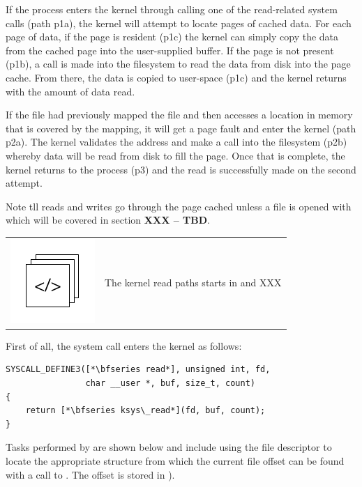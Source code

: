 \noindent
If the process enters the kernel through calling one of the read-related system calls (path p1a), the kernel will attempt to locate pages of cached data. For each page of data, if the page is resident (p1c) the kernel can simply copy the data from the cached page into the user-supplied buffer. If the page is not present (p1b), a call is made into the filesystem to read the data from disk into the page cache. From there, the data is copied to user-space (p1c) and the kernel returns with the amount of data read.

If the file had previously mapped the file and then accesses a location in memory that is covered by the mapping, it will get a page fault and enter the kernel (path p2a). The kernel validates the address and make a call into the filesystem (p2b) whereby data will be read from disk to fill the page. Once that is complete, the kernel returns to the process (p3) and the read is successfully made on the second attempt.

Note tll reads and writes go through the page cached unless a file is opened with  which will be covered in section \textbf{XXX -- TBD}.

\begin{table}[h]
\begin{tabular}{ll}
\parbox[l]{0.6in}{\includegraphics[scale=0.8]{figures/src-xref.pdf}} & \parbox[l]{4in}{\small{The kernel read paths starts in  and XXX}}
\end{tabular}
\end{table}

\noindent
First of all, the  system call enters the kernel as follows:

\begin{lstlisting}
SYSCALL_DEFINE3([*\bfseries read*], unsigned int, fd, 
                char __user *, buf, size_t, count)
{
    return [*\bfseries ksys\_read*](fd, buf, count);
}
\end{lstlisting}

\noindent
Tasks performed by  are shown below and include using the file descriptor to locate the appropriate  structure from which the current file offset can be found with a call to . The offset is stored in ). 

